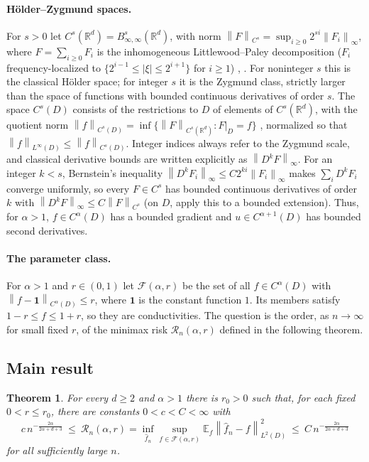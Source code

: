 \documentclass[11pt]{article}
\numberwithin{equation}{section}
\newtheorem{theorem}{Theorem}[section]
\newcommand{\R}{\mathbb R}
\newcommand{\E}{\mathbb E}
\newcommand{\norm}[1]{\left\|#1\right\|}
\begin{document}
\paragraph{H\"older--Zygmund spaces.}
For $s>0$ let $C^s(\R^d)=B^s_{\infty,\infty}(\R^d)$, with norm
$\norm F_{C^s}=\sup_{i\ge0}2^{si}\norm{F_i}_\infty$, where
$F=\sum_{i\ge0}F_i$ is the inhomogeneous Littlewood--Paley
decomposition ($F_i$ frequency-localized to
$\{2^{i-1}\le|\xi|\le2^{i+1}\}$ for $i\ge1$) \cite[Section 4.3]{GN},
\cite{Triebel}. For noninteger $s$ this is the classical H\"older
space; for integer $s$ it is the Zygmund class, strictly larger than
the space of functions with bounded continuous derivatives of order
$s$. The space $C^s(D)$ consists of the restrictions to $D$ of elements
of $C^s(\R^d)$, with the quotient norm
$\norm f_{C^s(D)}=\inf\{\norm F_{C^s(\R^d)}:F|_D=f\}$
\cite[Section 4.3.6]{GN}, normalized so that
$\norm f_{L^\infty(D)}\le\norm f_{C^s(D)}$. Integer indices always
refer to the Zygmund scale, and classical derivative bounds are written
explicitly as $\norm{D^kF}_\infty$. For an integer $k<s$, Bernstein's
inequality $\norm{D^kF_i}_\infty\le C2^{ki}\norm{F_i}_\infty$
\cite[Lemma 4.3.4]{GN} makes $\sum_iD^kF_i$ converge uniformly, so
every $F\in C^s$ has bounded continuous derivatives of order $k$ with
$\norm{D^kF}_\infty\le C\norm F_{C^s}$ (on $D$, apply this to a bounded
extension). Thus, for $\alpha>1$, $f\in C^\alpha(D)$ has a bounded
gradient and $u\in C^{\alpha+1}(D)$ has bounded second derivatives.

\paragraph{The parameter class.}
For $\alpha>1$ and $r\in(0,1)$ let $\mathcal F(\alpha,r)$ be the set
of all $f\in C^\alpha(D)$ with $\norm{f-\mathbf 1}_{C^\alpha(D)}\le r$,
where $\mathbf 1$ is the constant function $1$. Its members satisfy
$1-r\le f\le1+r$, so they are conductivities. The question is the order,
as $n\to\infty$ for small fixed $r$, of the minimax risk
$\mathcal R_n(\alpha,r)$ defined in the following theorem.

\subsection{Main result}

\begin{theorem}\label{thm:main}
For every $d\ge2$ and $\alpha>1$ there is $r_0>0$ such that, for each
fixed $0<r\le r_0$, there are constants $0<c<C<\infty$ with
\[
 c\,n^{-\frac{2\alpha}{2\alpha+d+3}}
 \ \le\
 \mathcal R_n(\alpha,r)
 =\inf_{\widehat f_n}\sup_{f\in\mathcal F(\alpha,r)}
 \E_f\norm{\widehat f_n-f}_{L^2(D)}^2
 \ \le\
 C\,n^{-\frac{2\alpha}{2\alpha+d+3}}
\]
for all sufficiently large $n$.
\end{theorem}
\end{document}
